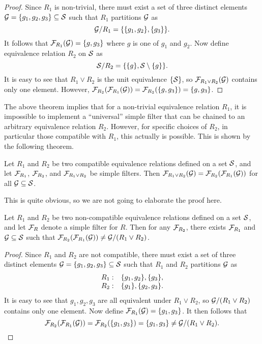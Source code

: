 \begin{proof}
Since $R_1$ is non-trivial, there must exist a set of three distinct elements $\mathcal{G} = \{ g_1, g_2, g_3 \} \subseteq \mathcal{S}$ such that $R_1$ partitions $\mathcal{G}$ as
\[
\mathcal{G} / R_1 = \{ \{ g_1, g_2 \}, \{ g_3 \} \} .
\]
It follows that $\mathcal{F}_{R_1} (\mathcal{G}) = \{ g, g_3 \}$ where $g$ is one of $g_1$ and $g_2$. 
Now define equivalence relation $R_2$ on $\mathcal{S}$ as
\[
\mathcal{S} / R_2 = \{ \{g\}, \mathcal{S} \setminus \{g\} \} .
\]
It is easy to see that $R_1 \vee R_2$ is the unit equivalence $\{ \mathcal{S} \}$, so $\mathcal{F}_{R_1 \vee R_2}(\mathcal{G})$ contains only one element. However, $\mathcal{F}_{R_2}(\mathcal{F}_{R_1}(\mathcal{G})) = \mathcal{F}_{R_2}(\{ g, g_3 \}) = \{ g, g_3 \}$.
\end{proof}

The above theorem implies that for a non-trivial equivalence relation $R_1$, it is impossible to implement a ``universal'' simple filter that can be chained to an arbitrary equivalence relation $R_2$. However, for specific choices of $R_2$, in particular those compatible with $R_1$, this actually is possible. This is shown by the following theorem.

\begin{theorem}
Let $R_1$ and $R_2$ be two compatible equivalence relations defined on a set $\mathcal{S}$, and let $\mathcal{F}_{R_1}$, $\mathcal{F}_{R_2}$, and $\mathcal{F}_{R_1 \vee R_2}$ be simple filters. Then $\mathcal{F}_{R_1 \vee R_2}(\mathcal{G}) = \mathcal{F}_{R_2}(\mathcal{F}_{R_1}(\mathcal{G}))$ for all $\mathcal{G} \subseteq \mathcal{S}$.
\end{theorem}

This is quite obvious, so we are not going to elaborate the proof here.

\begin{theorem}
Let $R_1$ and $R_2$ be two non-compatible equivalence relations defined on a set $\mathcal{S}$, and let $\mathcal{F}_R$ denote a simple filter for $R$. Then for any $\mathcal{F}_{R_2}$, there exists $\mathcal{F}_{R_1}$ and $\mathcal{G} \subseteq \mathcal{S}$ such that $\mathcal{F}_{R_2}(\mathcal{F}_{R_1}(\mathcal{G})) \ne \mathcal{G} / (R_1 \vee R_2)$.
\end{theorem}

\begin{proof}
Since $R_1$ and $R_2$ are not compatible, there must exist a set of three distinct elements $\mathcal{G} = \{ g_1, g_2, g_3 \} \subseteq \mathcal{S}$ such that $R_1$ and $R_2$ partitions $\mathcal{G}$ as
\[
\begin{array}{ r l }
R_1: & \{ g_1, g_2 \}, \{ g_3 \} , \\
R_2: & \{ g_1 \}, \{ g_2, g_3 \} .
\end{array}
\]
It is easy to see that $g_1, g_2, g_3$ are all equivalent under $R_1 \vee R_2$, so $\mathcal{G} / (R_1 \vee R_2)$ contains only one element.
Now define $\mathcal{F}_{R_1} (\mathcal{G}) = \{ g_1, g_3 \}$. It then follows that
\[
\mathcal{F}_{R_2}(\mathcal{F}_{R_1}(\mathcal{G})) = \mathcal{F}_{R_2}(\{ g_1, g_3 \}) = \{ g_1, g_3 \} \ne \mathcal{G} / (R_1 \vee R_2) .
\]
\end{proof}

